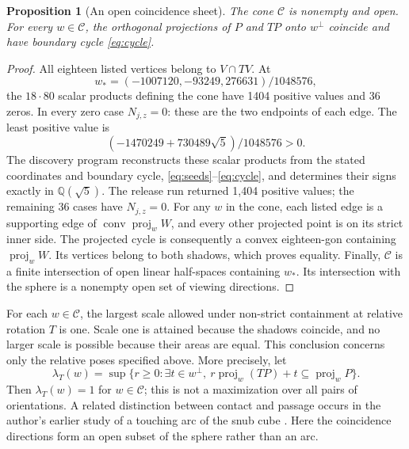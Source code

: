\documentclass[11pt]{amsart}
\newcommand{\Q}{\mathbb Q}
\newcommand{\conv}{\operatorname{conv}}
\newcommand{\proj}{\operatorname{proj}}
\newtheorem{proposition}[theorem]{Proposition}
\theoremstyle{definition}
\theoremstyle{remark}
\begin{document}
\begin{proposition}[An open coincidence sheet]\label{prop:coincidence}
The cone $\mathcal C$ is nonempty and open. For every $w\in\mathcal C$,
the orthogonal projections of $P$ and $TP$ onto $w^\perp$ coincide and
have boundary cycle \eqref{eq:cycle}.
\end{proposition}
\begin{proof}
All eighteen listed vertices belong to $V\cap TV$. At
\[
 w_*={(-1007120,-93249,276631)}/{1048576},
\]
the $18\cdot80$ scalar products defining the cone have 1404 positive
values and 36 zeros. In every zero case $N_{j,z}=0$: these are the two
endpoints of each edge. The least positive value is
\[
 (-1470249+730489\sqrt5)/1048576>0.
\]
The discovery program reconstructs these scalar products from the stated
coordinates and boundary cycle, \eqref{eq:seeds}--\eqref{eq:cycle}, and
determines their signs exactly in $\Q(\sqrt5)$. The release run returned
1,404 positive values; the remaining 36 cases have $N_{j,z}=0$. For any $w$ in the cone, each listed edge is a supporting
edge of $\conv\proj_w W$, and every other projected point is on its
strict inner side. The projected cycle is consequently a convex
eighteen-gon containing $\proj_w W$. Its vertices belong to both shadows,
which proves equality. Finally, $\mathcal C$ is a finite intersection of
open linear half-spaces containing $w_*$. Its intersection with the sphere
is a nonempty open set of viewing directions.
\end{proof}

For each $w\in\mathcal C$, the largest scale allowed under non-strict
containment at relative rotation $T$ is one. Scale one is attained because
the shadows coincide, and no larger scale is possible because their areas
are equal. This conclusion concerns only the relative poses specified above.
More precisely, let
\[
 \lambda_T(w)=\sup\{r\ge0:\exists t\in w^\perp,
                   \ r\proj_w(TP)+t\subseteq\proj_wP\}.
\]
Then $\lambda_T(w)=1$ for $w\in\mathcal C$; this is not a
maximization over all pairs of orientations. A related distinction
between contact and passage occurs in the author's earlier study of a
touching arc of the snub cube \cite{yoo}. Here the coincidence directions
form an open subset of the sphere rather than an arc.


\end{document}
